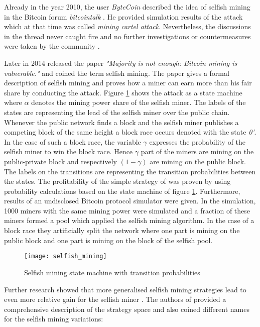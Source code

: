 Already in the year 2010, the user \textit{ByteCoin} described the idea of selfish mining in the Bitcoin forum \textit{bitcointalk} \cite{ByteCoin2010}.
He provided simulation results of the attack which at that time was called \textit{mining cartel attack}.
Nevertheless, the discussions in the thread never caught fire and no further investigations or countermeasures were taken by the community \cite{BitcoinTalk2010, bahack2013theoretical}.

Later in 2014 \cite{eyal2014majority} released the paper \textit{"Majority is not enough: Bitcoin mining is vulnerable."} and coined the term selfish mining.
The paper gives a formal description of selfish mining and proves how a miner can earn more than his fair share by conducting the attack.
Figure \ref{fig:selfish_mining} shows the attack as a state machine where $\alpha$ denotes the mining power share of the selfish miner.
The labels of the states are representing the lead of the selfish miner over the public chain.
Whenever the public network finds a block and the selfish miner publishes a competing block of the same height a block race occurs denoted with the state \textit{0'}.
In the case of such a block race, the variable $\gamma$ expresses the probability of the selfish miner to win the block race.
Hence $\gamma$ part of the miners are mining on the public-private block and respectively $(1 - \gamma)$ are mining on the public block.
The labels on the transitions are representing the transition probabilities between the states.
The profitability of the simple strategy of \cite{eyal2014majority} was proven by using probability calculations based on the state machine of figure \ref{fig:selfish_mining}.
Furthermore, results of an undisclosed Bitcoin protocol simulator were given.
In the simulation, 1000 miners with the same mining power were simulated and a fraction of these miners formed a pool which applied the selfish mining algorithm.
In the case of a block race they artificially split the network where one part is mining on the public block and one part is mining on the block of the selfish pool.

\begin{figure}[t]
\texttt{[image: selfish\_mining]}
\centering
\caption{Selfish mining state machine with transition probabilities \cite{eyal2014majority}}
\label{fig:selfish_mining}
\end{figure}

Further research showed that more generalised selfish mining strategies lead to even more relative gain for the selfish miner \cite{nayak2016stubborn,sapirshtein2016optimal, gervais2015tampering, gervais2016security, bahack2013theoretical}.
The authors of \cite{nayak2016stubborn} provided a comprehensive description of the strategy space and also coined different names for the selfish mining variations:

